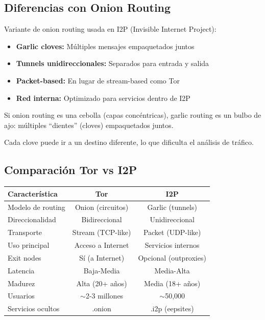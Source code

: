 \documentclass[11pt,a4paper,twoside]{book}
\begin{document}
\subsection{Diferencias con Onion Routing}

\begin{definition}
Variante de onion routing usada en I2P (Invisible Internet Project):
\begin{itemize}
    \item \textbf{Garlic cloves:} M\'ultiples mensajes empaquetados juntos
    \item \textbf{Tunnels unidireccionales:} Separados para entrada y salida
    \item \textbf{Packet-based:} En lugar de stream-based como Tor
    \item \textbf{Red interna:} Optimizado para servicios dentro de I2P
\end{itemize}
\end{definition}

\begin{intuicion}
Si onion routing es una cebolla (capas conc\'entricas), garlic routing es un bulbo de ajo: m\'ultiples ``dientes'' (cloves) empaquetados juntos.

Cada clove puede ir a un destino diferente, lo que dificulta el an\'alisis de tr\'afico.
\end{intuicion}

\subsection{Comparaci\'on Tor vs I2P}

\begin{center}
\small
\begin{tabular}{lcc}
\toprule
\textbf{Caracter\'istica} & \textbf{Tor} & \textbf{I2P} \\
\midrule
Modelo de routing & Onion (circuitos) & Garlic (tunnels) \\
Direccionalidad & Bidireccional & Unidireccional \\
Transporte & Stream (TCP-like) & Packet (UDP-like) \\
Uso principal & Acceso a Internet & Servicios internos \\
Exit nodes & S\'i (a Internet) & Opcional (outproxies) \\
Latencia & Baja-Media & Media-Alta \\
Madurez & Alta (20+ a\~nos) & Media (18+ a\~nos) \\
Usuarios & $\sim$2-3 millones & $\sim$50,000 \\
Servicios ocultos & .onion & .i2p (eepsites) \\
\bottomrule
\end{tabular}
\end{center}
\end{document}
